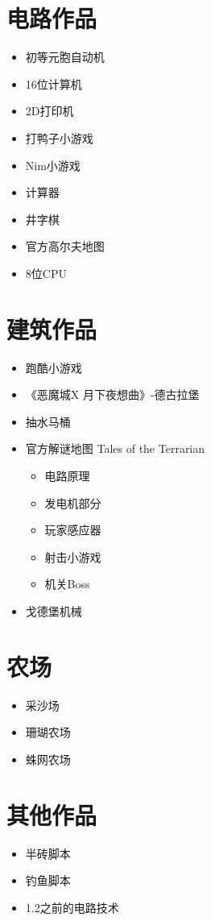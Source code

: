 \section{电路作品}
\begin{itemize}
\item {} 初等元胞自动机 
\item {} 16位计算机 
\item {} 2D打印机 
\item {} 打鸭子小游戏 
\item {} Nim小游戏 
\item {} 计算器 
\item {} 井字棋 
\item 官方高尔夫地图 
\item {} 8位CPU 
\end{itemize}

\section{建筑作品}
\begin{itemize}
\item {} 跑酷小游戏 
\item {} 《恶魔城X 月下夜想曲》-德古拉堡 
\item {} 抽水马桶 
\item 官方解谜地图 Tales of the Terrarian 
	\begin{itemize}
	\item 电路原理 
	\item 发电机部分 
	\item 玩家感应器 
	\item 射击小游戏 
	\item 机关Boss 
	\end{itemize}
\item {} 戈德堡机械 
\end{itemize}

\section{农场}
\begin{itemize}
\item {} 采沙场 
\item {} 珊瑚农场 
\item {} 蛛网农场 
\end{itemize}

\section{其他作品}
\begin{itemize}
\item {} 半砖脚本 
\item {} 钓鱼脚本 
\item {} 1.2之前的电路技术 
\end{itemize}